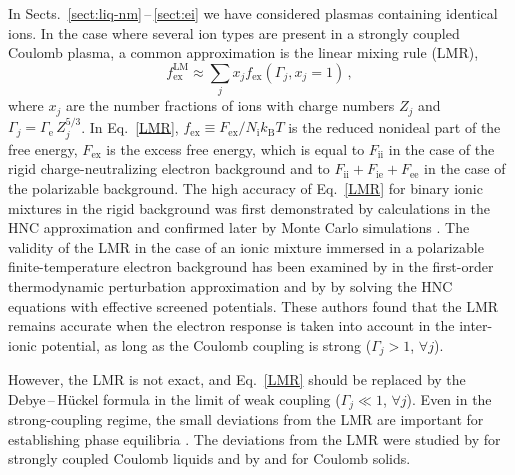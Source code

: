\documentclass[traditabstract]{aa}
\newcommand{\beq}{\begin{equation}}
\newcommand{\eeq}{\end{equation}}
\newcommand{\req}[1]{Eq.~\ref{#1}}
\newcommand{\Gamme}{\Gamma_\mathrm{e}}
\newcommand{\Nion}{N_\mathrm{i}}
\newcommand{\kB}{k_\mathrm{B}}
\begin{document}
In Sects.~\ref{sect:liq-nm}\,--\,\ref{sect:ei}
we have considered plasmas containing identical ions.
In the case where several ion types are present in a
strongly coupled Coulomb plasma,
a common approximation is the linear mixing rule
(LMR),
%
\beq
f_\mathrm{ex}^\mathrm{LM} 
\approx \sum_j x_j f_\mathrm{ex}(\Gamma_j,x_j=1)\,,
\label{LMR}
\eeq
%
where $x_j$ are the number fractions of ions with charge
numbers $Z_j$ and $\Gamma_j=\Gamme \,Z_j^{5/3}$. In
\req{LMR}, $f_\mathrm{ex}\equiv F_\mathrm{ex}/\Nion\kB T$ is
the reduced nonideal part of the free energy,
$F_\mathrm{ex}$ is the excess free energy, which is
equal to $F_\mathrm{ii}$ in the case
of the rigid
charge-neutralizing electron background and
to
$F_\mathrm{ii}+F_\mathrm{ie}+ F_\mathrm{ee}$ in the case of the
polarizable background.
The high accuracy of \req{LMR} for binary ionic mixtures in
the rigid background was first demonstrated by calculations
in the HNC approximation \citep{HTV77,BHJ79}
and confirmed later by Monte Carlo simulations
\citep{DWSC96,Rosenfeld96,DWS03}. The validity of the LMR
in the case of an ionic mixture immersed  in a
polarizable finite-temperature electron background
has been examined by \citet{HTV77} in the 
first-order thermodynamic perturbation approximation and  by
\citet{ChabAsh} by solving the HNC
equations with effective screened potentials. These authors
found that the LMR remains accurate when the electron
response is taken into account in the inter-ionic potential,
as long as the Coulomb coupling is strong ($\Gamma_j>1$,
$\forall j$).

However, the LMR is not exact, and \req{LMR}
should be replaced by the Debye\,--\,H\"uckel formula in the
limit of weak coupling ($\Gamma_j\ll1$, $\forall j$).  Even
in the strong-coupling regime, the small deviations from the
LMR are important for establishing phase equilibria
\citep[see][]{MedinCumming10}. The deviations from the LMR
were studied by
\citet{BHJ79,ChabAsh,DWSC96,DWS03,PCR09,PCCDR09} for
strongly coupled Coulomb liquids and by
\citet{Ogata-ea93} and \citet{DWS03} for Coulomb solids. 
\end{document}
